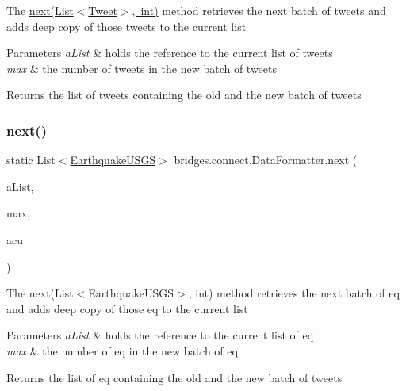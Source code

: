 The \mbox{\hyperlink{classbridges_1_1connect_1_1_data_formatter_a3d0b2d2e0384d2a537bb61fbeb3d00a4}{next(\+List$<$\+Tweet$>$, int)}} method retrieves the next batch of tweets and adds deep copy of those tweets to the current list 
\begin{DoxyParams}{Parameters}
{\em a\+List} & holds the reference to the current list of tweets \\
\hline
{\em max} & the number of tweets in the new batch of tweets \\
\hline
\end{DoxyParams}
\begin{DoxyReturn}{Returns}
the list of tweets containing the old and the new batch of tweets 
\end{DoxyReturn}
\mbox{\label{classbridges_1_1connect_1_1_data_formatter_ad451dd96b927702127d383e85fc98661}} 
\subsubsection{\texorpdfstring{next()}{next()}\hspace{0.1cm}{\footnotesize\ttfamily [2/2]}}
{\footnotesize\ttfamily static List$<$\mbox{\hyperlink{classbridges_1_1data__src__dependent_1_1_earthquake_u_s_g_s}{Earthquake\+U\+S\+GS}}$>$ bridges.\+connect.\+Data\+Formatter.\+next (\begin{DoxyParamCaption}\item[{List$<$ \mbox{\hyperlink{classbridges_1_1data__src__dependent_1_1_earthquake_u_s_g_s}{Earthquake\+U\+S\+GS}} $>$}]{a\+List,  }\item[{int}]{max,  }\item[{\mbox{\hyperlink{classbridges_1_1data__src__dependent_1_1_u_s_g_saccount}{U\+S\+G\+Saccount}}}]{acu }\end{DoxyParamCaption})\hspace{0.3cm}{\ttfamily [static]}}

The next(\+List$<$\+Earthquake\+U\+S\+G\+S$>$, int) method retrieves the next batch of eq and adds deep copy of those eq to the current list 
\begin{DoxyParams}{Parameters}
{\em a\+List} & holds the reference to the current list of eq \\
\hline
{\em max} & the number of eq in the new batch of eq \\
\hline
\end{DoxyParams}
\begin{DoxyReturn}{Returns}
the list of eq containing the old and the new batch of tweets 
\end{DoxyReturn}
\mbox{\label{classbridges_1_1connect_1_1_data_formatter_af9b878e5c092234a6ab5f8c11bee1fbd}} 
